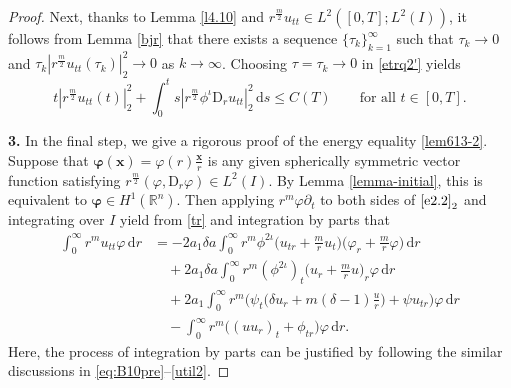 \documentclass[11pt,reqno]{amsart}
\numberwithin{rk}{section}
\numberwithin{prop}{section}
\numberwithin{mydef}{section}
\numberwithin{lem}{section}
\numberwithin{equation}{section}
\numberwithin{thm}{section}
\begin{document}
\begin{proof}
Next, thanks to Lemma \ref{l4.10} and $r^{\frac{m}{2}}u_{tt}\in L^2([0,T];L^2(I))$, it follows from  Lemma \ref{bjr} that there exists a sequence $\{\tau_k\}_{k=1}^\infty$ such that $\tau_k\to 0$ and $\tau_k|r^\frac{m}{2}u_{tt}(\tau_k)|_2^2\to 0$ as $k\to \infty$. Choosing $\tau=\tau_k\to 0$  in  \eqref{etrq2'} yields 
\begin{equation}\label{qunjin2}
t|r^{\frac{m}{2}}u_{tt}(t)|_2^2+ \int_0^t s |r^\frac{m}{2}\phi^\iota \mathrm{D}_r u_{tt}|_2^2\,\mathrm{d}s\leq C(T)\qquad\text{for all $t\in [0,T]$}.
\end{equation}


\textbf{3.} In the final step, we give a rigorous proof of the energy equality \eqref{lem613-2}. Suppose that $\boldsymbol{\varphi}(\boldsymbol{x})=\varphi(r)\frac{\boldsymbol{x}}{r}$ is any given spherically symmetric vector function satisfying $r^\frac{m}{2}(\varphi,\mathrm{D}_r\varphi)\in L^2(I)$. By Lemma \ref{lemma-initial}, this is equivalent to $\boldsymbol{\varphi}\in H^1(\mathbb{R}^n)$. 
Then applying $r^m\varphi\partial_t$ to both sides of $\eqref{e2.2}_2$ and integrating over $I$ yield from \eqref{tr} and integration by parts that 
\begin{equation*}
\begin{aligned}
\int_0^\infty r^mu_{tt}\varphi\,\mathrm{d}r&=-2a_1\delta a\int_0^\infty r^m\phi^{2\iota}\big(u_{tr}+\frac{m}{r}u_t\big)\big(\varphi_r+\frac{m}{r}\varphi\big)\,\mathrm{d}r\\
&\quad  +2a_1\delta a\int_0^\infty r^m(\phi^{2\iota})_t\big(u_{r}+\frac{m}{r}u\big)_r\varphi\,\mathrm{d}r \\
&\quad + 2a_1\int_0^\infty r^m \Big(\psi_t \big(\delta u_r+m(\delta-1)\frac{u}{r}\big) +\psi  u_{tr}\Big) \varphi\,\mathrm{d}r\\
&\quad -\int_0^\infty r^m\big((uu_r)_t+\phi_{tr}\big) \varphi\,\mathrm{d}r  .
\end{aligned}    
\end{equation*}
Here, the process of integration by parts can be justified by following the similar discussions in \eqref{eq:B10pre}--\eqref{util2}. 


\end{proof}
\end{document}
